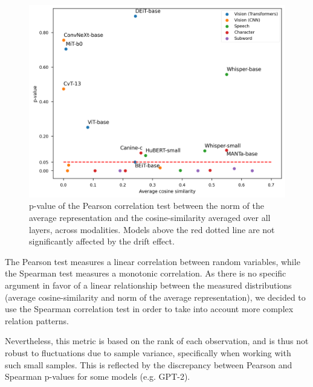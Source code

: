 \begin{figure}[ht]
    \centering
    \includegraphics[width=\linewidth]{sources/part_1/anisotropy/imgs/pval_vs_cosine_pearson.png}
    \caption{p-value of the Pearson correlation test between the norm of the average representation and the cosine-similarity averaged over all layers, across modalities. Models above the red dotted line are not significantly affected by the drift effect.}
    \label{fig:pval_vs_cos_pearson}
\end{figure}

The Pearson test measures a linear correlation between random variables, while the Spearman test measures a monotonic correlation. As there is no specific argument in favor of a linear relationship between the measured distributions (average cosine-similarity and norm of the average representation), we decided to use the Spearman correlation test in order to take into account more complex relation patterns.

Nevertheless, this metric is based on the rank of each observation, and is thus not robust to fluctuations due to sample variance, specifically when working with such small samples. This is reflected by the discrepancy between Pearson and Spearman p-values for some models (e.g. GPT-2).

